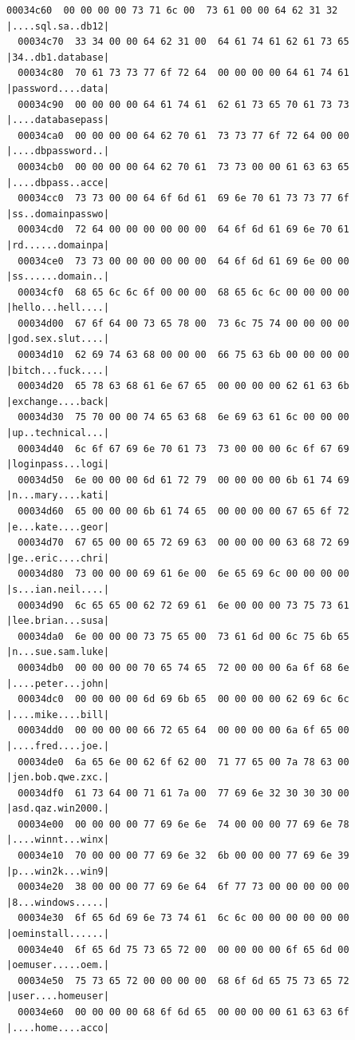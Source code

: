 \documentclass[]{project_plan}
\begin{document}
\begin{lstlisting}[basicstyle=\tiny]
  00034c60  00 00 00 00 73 71 6c 00  73 61 00 00 64 62 31 32  |....sql.sa..db12|
  00034c70  33 34 00 00 64 62 31 00  64 61 74 61 62 61 73 65  |34..db1.database|
  00034c80  70 61 73 73 77 6f 72 64  00 00 00 00 64 61 74 61  |password....data|
  00034c90  00 00 00 00 64 61 74 61  62 61 73 65 70 61 73 73  |....databasepass|
  00034ca0  00 00 00 00 64 62 70 61  73 73 77 6f 72 64 00 00  |....dbpassword..|
  00034cb0  00 00 00 00 64 62 70 61  73 73 00 00 61 63 63 65  |....dbpass..acce|
  00034cc0  73 73 00 00 64 6f 6d 61  69 6e 70 61 73 73 77 6f  |ss..domainpasswo|
  00034cd0  72 64 00 00 00 00 00 00  64 6f 6d 61 69 6e 70 61  |rd......domainpa|
  00034ce0  73 73 00 00 00 00 00 00  64 6f 6d 61 69 6e 00 00  |ss......domain..|
  00034cf0  68 65 6c 6c 6f 00 00 00  68 65 6c 6c 00 00 00 00  |hello...hell....|
  00034d00  67 6f 64 00 73 65 78 00  73 6c 75 74 00 00 00 00  |god.sex.slut....|
  00034d10  62 69 74 63 68 00 00 00  66 75 63 6b 00 00 00 00  |bitch...fuck....|
  00034d20  65 78 63 68 61 6e 67 65  00 00 00 00 62 61 63 6b  |exchange....back|
  00034d30  75 70 00 00 74 65 63 68  6e 69 63 61 6c 00 00 00  |up..technical...|
  00034d40  6c 6f 67 69 6e 70 61 73  73 00 00 00 6c 6f 67 69  |loginpass...logi|
  00034d50  6e 00 00 00 6d 61 72 79  00 00 00 00 6b 61 74 69  |n...mary....kati|
  00034d60  65 00 00 00 6b 61 74 65  00 00 00 00 67 65 6f 72  |e...kate....geor|
  00034d70  67 65 00 00 65 72 69 63  00 00 00 00 63 68 72 69  |ge..eric....chri|
  00034d80  73 00 00 00 69 61 6e 00  6e 65 69 6c 00 00 00 00  |s...ian.neil....|
  00034d90  6c 65 65 00 62 72 69 61  6e 00 00 00 73 75 73 61  |lee.brian...susa|
  00034da0  6e 00 00 00 73 75 65 00  73 61 6d 00 6c 75 6b 65  |n...sue.sam.luke|
  00034db0  00 00 00 00 70 65 74 65  72 00 00 00 6a 6f 68 6e  |....peter...john|
  00034dc0  00 00 00 00 6d 69 6b 65  00 00 00 00 62 69 6c 6c  |....mike....bill|
  00034dd0  00 00 00 00 66 72 65 64  00 00 00 00 6a 6f 65 00  |....fred....joe.|
  00034de0  6a 65 6e 00 62 6f 62 00  71 77 65 00 7a 78 63 00  |jen.bob.qwe.zxc.|
  00034df0  61 73 64 00 71 61 7a 00  77 69 6e 32 30 30 30 00  |asd.qaz.win2000.|
  00034e00  00 00 00 00 77 69 6e 6e  74 00 00 00 77 69 6e 78  |....winnt...winx|
  00034e10  70 00 00 00 77 69 6e 32  6b 00 00 00 77 69 6e 39  |p...win2k...win9|
  00034e20  38 00 00 00 77 69 6e 64  6f 77 73 00 00 00 00 00  |8...windows.....|
  00034e30  6f 65 6d 69 6e 73 74 61  6c 6c 00 00 00 00 00 00  |oeminstall......|
  00034e40  6f 65 6d 75 73 65 72 00  00 00 00 00 6f 65 6d 00  |oemuser.....oem.|
  00034e50  75 73 65 72 00 00 00 00  68 6f 6d 65 75 73 65 72  |user....homeuser|
  00034e60  00 00 00 00 68 6f 6d 65  00 00 00 00 61 63 63 6f  |....home....acco|

\end{lstlisting}
\end{document}

